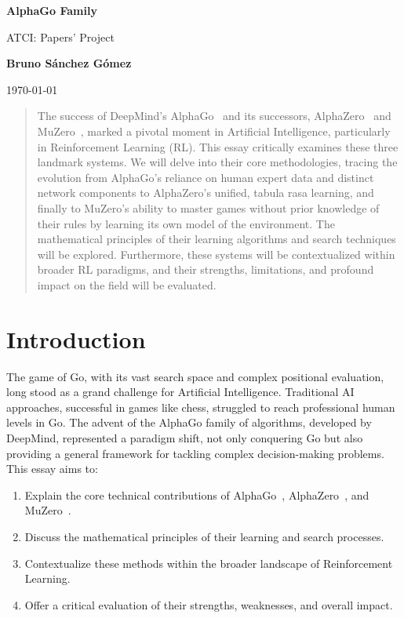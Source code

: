 \documentclass[11pt,a4paper]{article}
\author{Bruno Sánchez Gómez}
\date{\today}
\begin{document}
\begin{titlepage}
    \centering
    \vspace*{2cm}
    {\Huge \bfseries AlphaGo Family \par}
    \vspace{2cm}
    {\huge ATCI: Papers' Project \par}
    \vspace{10cm}
    {\large \textbf{Bruno Sánchez Gómez} \par}
    \vfill
    {\large \today \par}
\end{titlepage}

\begin{abstract}
The success of DeepMind's AlphaGo~\cite{alphago} and its successors, AlphaZero~\cite{alphazero} and MuZero~\cite{muzero}, marked a pivotal moment in Artificial Intelligence, particularly in Reinforcement Learning (RL). This essay critically examines these three landmark systems. We will delve into their core methodologies, tracing the evolution from AlphaGo's reliance on human expert data and distinct network components to AlphaZero's unified, tabula rasa learning, and finally to MuZero's ability to master games without prior knowledge of their rules by learning its own model of the environment. The mathematical principles of their learning algorithms and search techniques will be explored. Furthermore, these systems will be contextualized within broader RL paradigms, and their strengths, limitations, and profound impact on the field will be evaluated.
\end{abstract}

\section{Introduction}
The game of Go, with its vast search space and complex positional evaluation, long stood as a grand challenge for Artificial Intelligence. Traditional AI approaches, successful in games like chess, struggled to reach professional human levels in Go. The advent of the AlphaGo family of algorithms, developed by DeepMind, represented a paradigm shift, not only conquering Go but also providing a general framework for tackling complex decision-making problems. This essay aims to:
\begin{enumerate}
    \item Explain the core technical contributions of AlphaGo~\cite{alphago}, AlphaZero~\cite{alphazero}, and MuZero~\cite{muzero}.
    \item Discuss the mathematical principles of their learning and search processes.
    \item Contextualize these methods within the broader landscape of Reinforcement Learning.
    \item Offer a critical evaluation of their strengths, weaknesses, and overall impact.
\end{enumerate}
\end{document}
